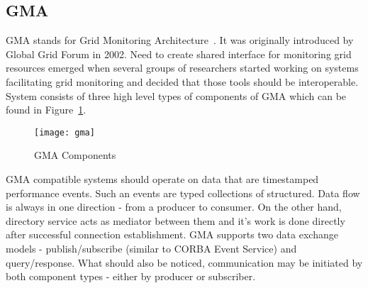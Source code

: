 \subsection{GMA}
\label{ssec:gma}
GMA stands for Grid Monitoring Architecture~\cite{GMA1,GMA2}. It was originally introduced by Global Grid Forum in 2002. Need to create shared interface for monitoring grid resources emerged when several groups of researchers started working on systems facilitating grid monitoring and decided that those tools should be interoperable. System consists of three high level types of components of GMA which can be found in Figure~\ref{fig:gma}.

\begin{figure}[ht]
  \centering
  \texttt{[image: gma]}
  \caption{GMA Components}
  \label{fig:gma}
\end{figure}

GMA compatible systems should operate on data that are timestamped performance events. Such an events are typed collections of structured. Data flow is always in one direction - from a producer to consumer. On the other hand, directory service acts as mediator between them and it\rq{}s work is done directly after successful connection establishment. GMA supports two data exchange models - publish/subscribe (similar to CORBA Event Service) and query/response. What should also be noticed, communication may be initiated by both component types - either by producer or subscriber.

